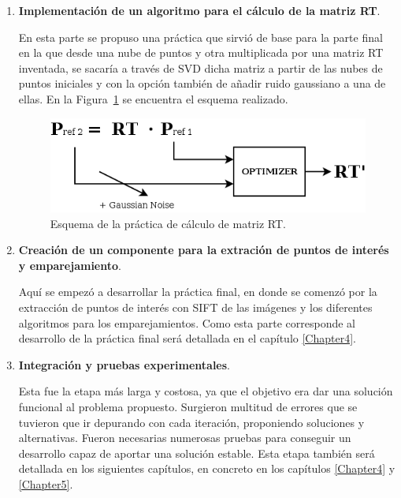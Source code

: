 \begin{enumerate}
\begin{itemize}
\end{itemize}

\item \textbf{Implementación de un algoritmo para el cálculo de la matriz RT}.

En esta parte se propuso una práctica que sirvió de base para la parte final en la que desde una nube de puntos y otra multiplicada por una matriz RT inventada, se sacaría a través de SVD dicha matriz a partir de las nubes de puntos iniciales y con la opción también de añadir ruido gaussiano a una de ellas. En la Figura~\ref{fig:rtsvd} se encuentra el esquema realizado.

\begin{figure}[th]
\centering
\includegraphics[scale=0.6]{Figures/rt_svd.png}
\decoRule
\caption[Rtsvd]{Esquema de la práctica de cálculo de matriz RT.}
\label{fig:rtsvd}
\end{figure}

\item \textbf{Creación de un componente para la extración de puntos de interés y emparejamiento}.

Aquí se empezó a desarrollar la práctica final, en donde se comenzó por la extracción de puntos de interés con SIFT de las imágenes y los diferentes algoritmos para los emparejamientos. Como esta parte corresponde al desarrollo de la práctica final será detallada en el capítulo \ref{Chapter4}.

\item \textbf{Integración y pruebas experimentales}.

Esta fue la etapa más larga y costosa, ya que el objetivo era dar una solución funcional al problema propuesto. Surgieron multitud de errores que se tuvieron que ir depurando con cada iteración, proponiendo soluciones y alternativas. Fueron necesarias numerosas pruebas para conseguir un desarrollo capaz de aportar una solución estable. Esta etapa también será detallada en los siguientes capítulos, en concreto en los capítulos \ref{Chapter4} y \ref{Chapter5}.

\end{enumerate}